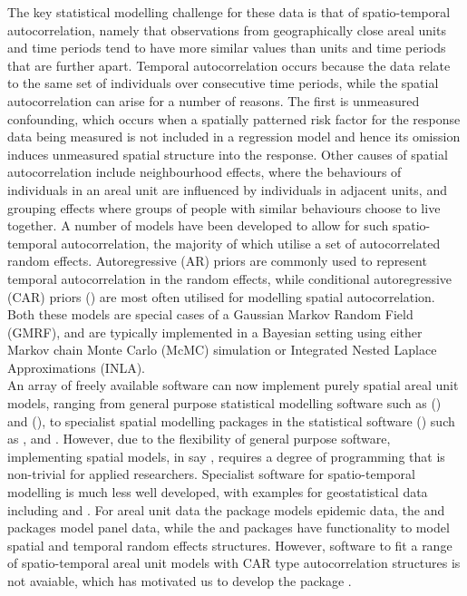 \documentclass[article,shortnames,nojss]{jss}
\begin{document}
The key statistical modelling challenge for these data is that of spatio-temporal autocorrelation, namely that observations from geographically close areal units and time periods tend to have more similar values than units and time periods that are further apart. Temporal autocorrelation occurs because the data relate to the same set of individuals over consecutive time periods, while the spatial autocorrelation can arise for a number of reasons. The first is unmeasured confounding, which occurs when a spatially patterned risk factor for the response data being measured is not included in a regression  model and hence its omission induces unmeasured spatial structure into the response. Other causes of spatial autocorrelation include neighbourhood effects, where the behaviours of individuals in an areal unit  are influenced by individuals in adjacent units, and grouping effects where groups of people with similar behaviours choose to live together.  A number of models have been developed to allow for such spatio-temporal autocorrelation, the majority of which utilise a set of autocorrelated random effects. Autoregressive (AR) priors are commonly used to represent temporal autocorrelation in the random effects, while conditional autoregressive (CAR) priors (\citealp{besag1991}) are most often utilised for modelling spatial autocorrelation. Both these models are special cases of a Gaussian Markov Random Field (GMRF), and are typically implemented in a Bayesian setting using either Markov chain Monte Carlo (McMC) simulation or Integrated Nested Laplace Approximations (INLA).\\

An array of freely available software can now implement purely spatial areal unit models, ranging from general purpose statistical modelling software such as  (\citealp{lunn2009}) and  (\citealp{rue2009}), to specialist spatial modelling packages in the statistical software  (\citealp{R})  such as ,  and . However, due to the flexibility of general purpose software, implementing spatial models, in say , requires a degree of programming that is non-trivial for applied researchers. Specialist software for spatio-temporal modelling is much less well developed, with examples for geostatistical data including  and . For areal unit data the  package models epidemic data, the  and  packages model panel data, while the  and  packages have functionality to model spatial and temporal random effects structures. However, software to fit a range of spatio-temporal areal unit models with CAR type autocorrelation structures is not avaiable, which has  motivated us to develop the  package .\\
\end{document}
